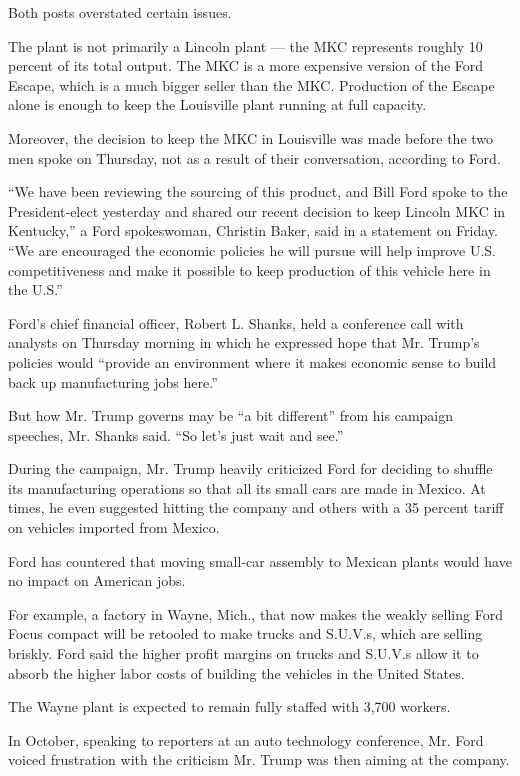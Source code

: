 Both posts overstated certain issues.

The plant is not primarily a Lincoln plant --- the MKC represents
roughly 10 percent of its total output. The MKC is a more expensive
version of the Ford Escape, which is a much bigger seller than the MKC.
Production of the Escape alone is enough to keep the Louisville plant
running at full capacity.

Moreover, the decision to keep the MKC in Louisville was made before the
two men spoke on Thursday, not as a result of their conversation,
according to Ford.

``We have been reviewing the sourcing of this product, and Bill Ford
spoke to the President-elect yesterday and shared our recent decision to
keep Lincoln MKC in Kentucky,'' a Ford spokeswoman, Christin Baker, said
in a statement on Friday. ``We are encouraged the economic policies he
will pursue will help improve U.S. competitiveness and make it possible
to keep production of this vehicle here in the U.S.''

Ford's chief financial officer, Robert L. Shanks, held a conference call
with analysts on Thursday morning in which he expressed hope that Mr.
Trump's policies would ``provide an environment where it makes economic
sense to build back up manufacturing jobs here.''

But how Mr. Trump governs may be ``a bit different'' from his campaign
speeches, Mr. Shanks said. ``So let's just wait and see.''

During the campaign, Mr. Trump heavily criticized Ford for deciding to
shuffle its manufacturing operations so that all its small cars are made
in Mexico. At times, he even suggested hitting the company and others
with a 35 percent tariff on vehicles imported from Mexico.

Ford has countered that moving small-car assembly to Mexican plants
would have no impact on American jobs.

For example, a factory in Wayne, Mich., that now makes the weakly
selling Ford Focus compact will be retooled to make trucks and S.U.V.s,
which are selling briskly. Ford said the higher profit margins on trucks
and S.U.V.s allow it to absorb the higher labor costs of building the
vehicles in the United States.

The Wayne plant is expected to remain fully staffed with 3,700 workers.

In October, speaking to reporters at an auto technology conference, Mr.
Ford voiced frustration with the criticism Mr. Trump was then aiming at
the company.

